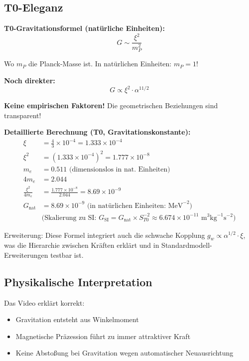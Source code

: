 \documentclass[12pt,a4paper]{article}
\newcommand{\xipar}{\xi}
\begin{document}
	\subsection{T0-Eleganz}
	
	\begin{vorteil}
		\textbf{T0-Gravitationsformel (natürliche Einheiten):}
		\begin{equation}
			\boxed{G \sim \frac{\xipar^2}{m_P^2}}
		\end{equation}
		
		Wo $m_P$ die Planck-Masse ist. In natürlichen Einheiten: $m_P = 1$!
		
		\textbf{Noch direkter:}
		\begin{equation}
			\boxed{G \propto \xipar^2 \cdot \alpha^{11/2}}
		\end{equation}
		
		\textbf{Keine empirischen Faktoren!} Die geometrischen Beziehungen sind transparent!
		
		\textbf{Detaillierte Berechnung (T0, Gravitationskonstante):}
		\begin{align}
			\xipar &= \frac{4}{3} \times 10^{-4} = 1.333 \times 10^{-4} \\
			\xipar^2 &= (1.333 \times 10^{-4})^2 = 1.777 \times 10^{-8} \\
			m_e &= 0.511 \text{ (dimensionslos in nat. Einheiten)} \\
			4 m_e &= 2.044 \\
			\frac{\xipar^2}{4 m_e} &= \frac{1.777 \times 10^{-8}}{2.044} = 8.69 \times 10^{-9} \\
			G_{\text{nat}} &= 8.69 \times 10^{-9} \text{ (in natürlichen Einheiten: MeV}^{-2}\text{)} \\
			&\text{(Skalierung zu SI: } G_{\text{SI}} = G_{\text{nat}} \times S_{T0}^{-2} \approx 6.674 \times 10^{-11} \text{ m}^3 \text{kg}^{-1} \text{s}^{-2}\text{)}
		\end{align}
		
		Erweiterung: Diese Formel integriert auch die schwache Kopplung $g_w \propto \alpha^{1/2} \cdot \xipar$, was die Hierarchie zwischen Kräften erklärt und in Standardmodell-Erweiterungen testbar ist.
	\end{vorteil}
	
	\subsection{Physikalische Interpretation}
	
	Das Video erklärt korrekt:
	\begin{itemize}
		\item Gravitation entsteht aus Winkelmoment
		\item Magnetische Präzession führt zu immer attraktiver Kraft
		\item Keine Abstoßung bei Gravitation wegen automatischer Neuausrichtung
	\end{itemize}
	
\end{document}
